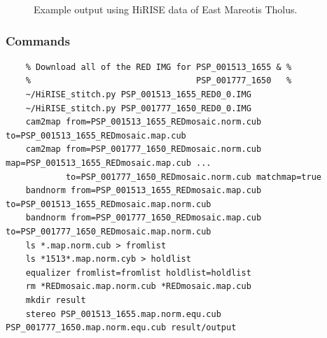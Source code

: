 \begin{figure}[h!]
\centering
  \hfil
\caption{Example output using HiRISE data of East Mareotis Tholus.}
\label{fig:hirise_chills_example}
\end{figure}

\subsubsection*{Commands}

\begin{verbatim}
    % Download all of the RED IMG for PSP_001513_1655 & %
    %                                 PSP_001777_1650   %
    ~/HiRISE_stitch.py PSP_001513_1655_RED0_0.IMG
    ~/HiRISE_stitch.py PSP_001777_1650_RED0_0.IMG
    cam2map from=PSP_001513_1655_REDmosaic.norm.cub to=PSP_001513_1655_REDmosaic.map.cub
    cam2map from=PSP_001777_1650_REDmosaic.norm.cub map=PSP_001513_1655_REDmosaic.map.cub ...
            to=PSP_001777_1650_REDmosaic.norm.cub matchmap=true
    bandnorm from=PSP_001513_1655_REDmosaic.map.cub to=PSP_001513_1655_REDmosaic.map.norm.cub
    bandnorm from=PSP_001777_1650_REDmosaic.map.cub to=PSP_001777_1650_REDmosaic.map.norm.cub
    ls *.map.norm.cub > fromlist
    ls *1513*.map.norm.cyb > holdlist
    equalizer fromlist=fromlist holdlist=holdlist
    rm *REDmosaic.map.norm.cub *REDmosaic.map.cub
    mkdir result
    stereo PSP_001513_1655.map.norm.equ.cub PSP_001777_1650.map.norm.equ.cub result/output
\end{verbatim}

